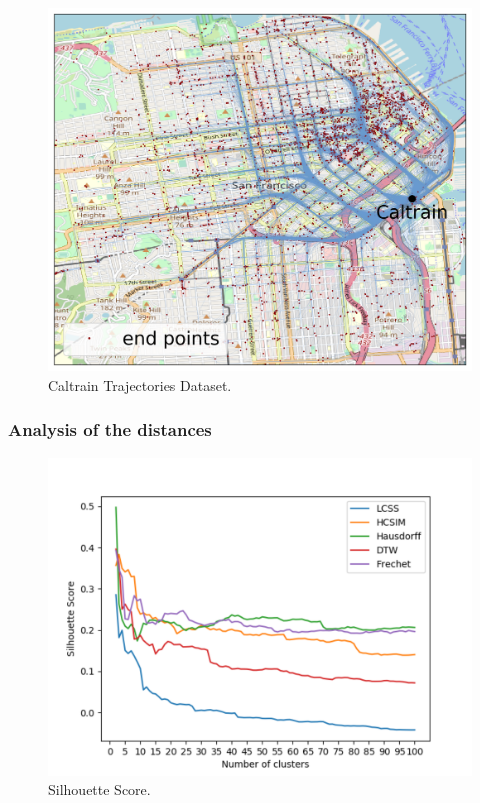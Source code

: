 \documentclass[a4paper, 12pt]{article}
\begin{document}
\begin{figure}[bp!]
    \centering
    \includegraphics[width=1\textwidth]{caltrain_trajectory_map.png}
    \caption{Caltrain Trajectories Dataset.}
    \label{fig37}
\end{figure}

\subsubsection{Analysis of the distances}

\begin{figure}[ht]
    \centering
    \includegraphics[width=1\textwidth]{silhouette_caltrain_score.png}
    \caption{Silhouette Score.}
    \label{fig38}
\end{figure}
\end{document}
